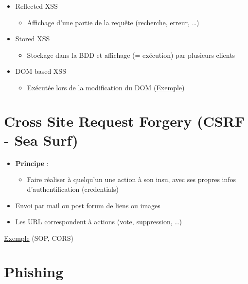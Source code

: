 \begin{itemize}
\tightlist
\item
  Reflected XSS

  \begin{itemize}
  \tightlist
  \item
    Affichage d'une partie de la requête (recherche, erreur, \ldots)
  \end{itemize}
\item
  Stored XSS

  \begin{itemize}
  \tightlist
  \item
    Stockage dans la BDD et affichage (= exécution) par plusieurs
    clients
  \end{itemize}
\item
  DOM based XSS

  \begin{itemize}
  \tightlist
  \item
    Exécutée lors de la modification du DOM
    (\href{https://www.owasp.org/index.php/DOM_Based_XSS}{Exemple})
  \end{itemize}
\end{itemize}

\hypertarget{cross-site-request-forgery-csrf---sea-surf}{%
\section{Cross Site Request Forgery (CSRF - Sea
Surf)}\label{cross-site-request-forgery-csrf---sea-surf}}

\begin{itemize}
\tightlist
\item
  \textbf{Principe} :

  \begin{itemize}
  \tightlist
  \item
    Faire réaliser à quelqu'un une action à son insu, avec ses propres
    infos d'authentification (credentials)
  \end{itemize}
\item
  Envoi par mail ou post forum de liens ou images
\item
  Les URL correspondent à actions (vote, suppression, \ldots)
\end{itemize}

\href{https://www.owasp.org/index.php/CSRF}{Exemple} (SOP, CORS)

\hypertarget{phishing}{%
\section{Phishing}\label{phishing}}

